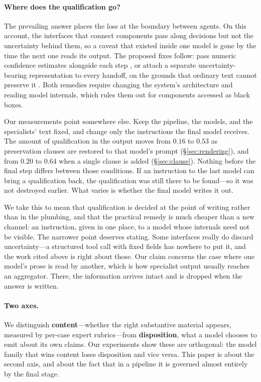 \documentclass[11pt]{article}
\begin{document}
\paragraph{Where does the qualification go?} The prevailing answer places the
loss at the boundary between agents. On this account, the interfaces that
connect components pass along decisions but not the uncertainty behind them,
so a caveat that existed inside one model is gone by the time the next one
reads its output. The proposed fixes follow: pass numeric confidence
estimates alongside each step \cite{uprop}, or attach a separate
uncertainty-bearing representation to every handoff, on the grounds that
ordinary text cannot preserve it \cite{laundering}. Both remedies require
changing the system's architecture and reading model internals, which rules
them out for components accessed as black boxes.

Our measurements point somewhere else. Keep the pipeline, the models, and the
specialists' text fixed, and change only the instructions the final model
receives. The amount of qualification in the output moves from $0.16$ to
$0.53$ as preservation clauses are restored to that model's prompt
(\S\ref{sec:rendering}), and from $0.20$ to $0.64$ when a single clause is
added (\S\ref{sec:clause}). Nothing before the final step differs between
those conditions. If an instruction to the last model can bring a
qualification back, the qualification was still there to be found---so it was
not destroyed earlier. What varies is whether the final model writes it out.

We take this to mean that qualification is decided at the point of writing
rather than in the plumbing, and that the practical remedy is much cheaper
than a new channel: an instruction, given in one place, to a model whose
internals need not be visible. The narrower point deserves stating. Some
interfaces really do discard uncertainty---a structured tool call with fixed
fields has nowhere to put it, and the work cited above is right about those.
Our claim concerns the case where one model's prose is read by another, which
is how specialist output usually reaches an aggregator. There, the
information arrives intact and is dropped when the answer is written.

\paragraph{Two axes.} We distinguish \textbf{content}---whether the right
substantive material appears, measured by per-case expert rubrics---from
\textbf{disposition}, what a model chooses to emit about its own claims. Our
experiments show these are orthogonal: the model family that wins content
loses disposition and vice versa. This paper is about the second axis, and
about the fact that in a pipeline it is governed almost entirely by the final
stage.
\end{document}
